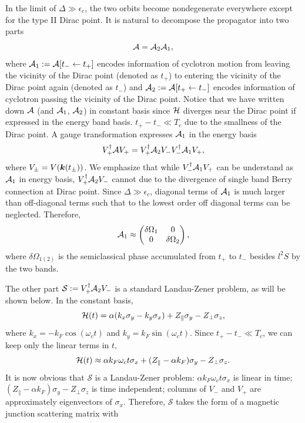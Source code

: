 \documentclass[aps, prb, showpacs, twocolumn, notitlepage, superscriptaddress]{revtex4-1}
\begin{document}
In the limit of $\Delta\gg\epsilon_c$, the two orbits become nondegenerate everywhere except for the type II Dirac point. It is natural to decompose the propagator into two parts
\begin{equation}
{\cal A} = {\cal A}_2{\cal A}_1,
\end{equation}
where ${\cal A}_1:={\cal A}[t_-\leftarrow t_+]$ encodes information of cyclotron motion from leaving the vicinity of the Dirac point (denoted as $t_+$) to entering the vicinity of the Dirac point again (denoted as $t_-$) and ${\cal A}_2:={\cal A}[t_+\leftarrow t_-]$ encodes information of cyclotron passing the vicinity of the Dirac point. Notice that we have written down ${\cal A}$ (and ${\cal A}_1$, ${\cal A}_2$) in constant basis since ${\cal H}$ diverges near the Dirac point if expressed in the energy band basis. $t_+-t_-\ll T_c$ due to the smallness of the Dirac point. A gauge transformation expresses ${\cal A}_1$ in the energy basis
\begin{equation}
V_+^\dagger{\cal A} V_+ = V_+^\dagger{\cal A}_2V_-V_-^\dagger{\cal A}_1V_+,
\end{equation}
where $V_\pm=V(\boldsymbol{k}(t_\pm))$. We emphasize that while $V_-^\dagger{\cal A}_1V_+$ can be understand as ${\cal A}_1$ in energy basis, $V_+^\dagger{\cal A}_2V_-$ cannot due to the divergence of single band Berry connection at Dirac point. Since $\Delta\gg\epsilon_c$, diagonal terms of ${\cal A}_1$ is much larger than off-diagonal terms such that to the lowest order off diagonal terms can be neglected. Therefore, 
\begin{equation}
{\cal A}_1\approx\begin{pmatrix} \delta \Omega_1 & 0 \\ 0 & \delta \Omega_2 \end{pmatrix},
\end{equation}
where $\delta\Omega_{1(2)}$ is the semiclassical phase accumulated from $t_+$ to $t_-$ besides $l^2 S$ by the two bands.


The other part $\mathcal{S}:=V_+^\dagger{\cal A}_2V_-$ is a standard Landau-Zener problem, as will be shown below. In the constant basis, 
\begin{equation}
{\cal H}(t)=\alpha(k_{x}\sigma_{y}-k_{y}\sigma_{x})+Z_\parallel\sigma_{y}-Z_\perp\sigma_{z},
\end{equation}
where $k_x=-k_F \cos(\omega_c t)$ and $k_y=k_F \sin(\omega_c t)$. Since $t_+-t_-\ll T_c$, we can keep only the linear terms in $t$,
\begin{equation}
{\cal H}(t)\approx\alpha k_F \omega_c t\sigma_x+(Z_\parallel-\alpha k_F)\sigma_y-Z_\perp\sigma_z.
\end{equation}
It is now obvious that $\mathcal{S}$ is a Landau-Zener problem: $\alpha k_F \omega_c t\sigma_x$ is linear in time; $(Z_\parallel-\alpha k_F)\sigma_y-Z_\perp\sigma_z$ is time independent; columns of $V_-$ and $V_+$ are approximately eigenvectors of $\sigma_x$. Therefore, $\mathcal{S}$ takes the form of a magnetic junction scattering matrix with
\end{document}
